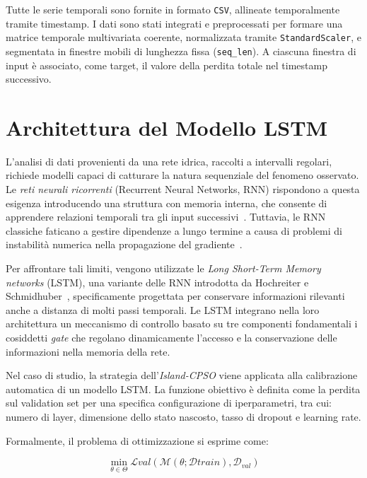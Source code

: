 \documentclass{article}
\begin{document}
Tutte le serie temporali sono fornite in formato \texttt{CSV}, allineate temporalmente
tramite timestamp. I dati sono stati integrati e preprocessati per formare una matrice 
temporale multivariata coerente, normalizzata tramite \texttt{StandardScaler}, e segmentata 
in finestre mobili di lunghezza fissa (\texttt{seq\_len}). A ciascuna finestra di input è 
associato, come target, il valore della perdita totale nel timestamp successivo.

\section{Architettura del Modello LSTM}

L'analisi di dati provenienti da una rete idrica, raccolti a intervalli regolari, richiede modelli 
capaci di catturare la natura sequenziale del fenomeno osservato. Le \emph{reti neurali ricorrenti} 
(Recurrent Neural Networks, RNN) rispondono a questa esigenza introducendo una struttura con memoria 
interna, che consente di apprendere relazioni temporali tra gli input successivi~\cite{elman1990finding}. 
Tuttavia, le RNN classiche faticano a gestire dipendenze a lungo termine a causa di problemi di instabilità 
numerica nella propagazione del gradiente~\cite{bengio1994learning}.

Per affrontare tali limiti, vengono utilizzate le \emph{Long Short-Term Memory networks} (LSTM), una 
variante delle RNN introdotta da Hochreiter e Schmidhuber~\cite{hochreiter1997long}, specificamente 
progettata per conservare informazioni rilevanti anche a distanza di molti passi temporali. Le LSTM 
integrano nella loro architettura un meccanismo di controllo basato su tre componenti fondamentali 
i cosiddetti \textit{gate} che regolano dinamicamente l'accesso e la conservazione delle informazioni 
nella memoria della rete.

Nel caso di studio, la strategia dell'\emph{Island-CPSO} viene applicata alla calibrazione automatica di un modello LSTM. 
La funzione obiettivo è definita come la perdita sul validation set per una specifica configurazione 
di iperparametri, tra cui: numero di layer, dimensione dello stato nascosto, tasso di dropout e learning 
rate.

Formalmente, il problema di ottimizzazione si esprime come:

\begin{equation}
\min_{\theta \in \Theta} \mathcal{L}{val}(\mathcal{M}(\theta; \mathcal{D}{train}), \mathcal{D}_{val})
\end{equation}
\end{document}
